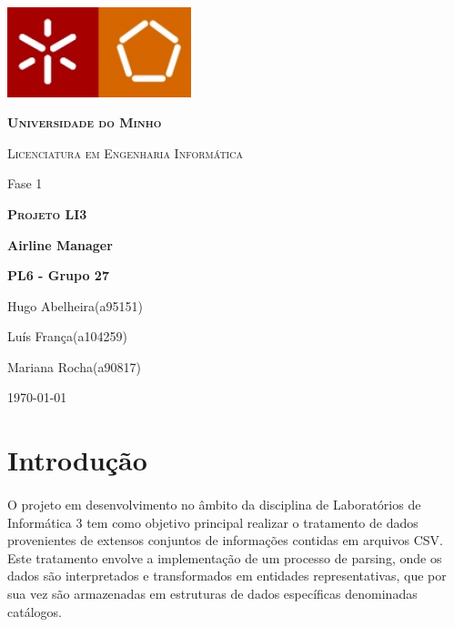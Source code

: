 \documentclass{article}
\begin{document}
\begin{center}
    \begin{minipage}{0.83\linewidth}
        \centering
        \includegraphics[width=0.4\textwidth]{Images/UM.jpg}\par\vspace{0.5cm}
        {\scshape\textbf{Universidade do Minho}} \par
        {\scshape Licenciatura em Engenharia Informática} \par
        \vspace{3cm}
        {\LARGE Fase 1\\} \par
        {\scshape\LARGE \textbf{Projeto LI3}\\} \par
        \vspace{1.0cm}
        {\LARGE \textbf{Airline Manager}} \par
        \vspace{2cm}
        {\LARGE\textbf {PL6 - Grupo 27}} \par
        \vspace{0.1cm}
        {\LARGE Hugo Abelheira(a95151)\par Luís França(a104259)\par Mariana Rocha(a90817) \par}
        
        \vspace{5cm}
        {\large \today\par}
        
    \end{minipage}
\end{center}
\newpage
\tableofcontents
\listoftables
\listoffigures

\newpage
\section{Introdução}
\paragraph{}O projeto em desenvolvimento no âmbito da disciplina de Laboratórios de Informática 3 tem como objetivo principal realizar o tratamento de dados provenientes de extensos conjuntos de informações contidas em arquivos CSV. Este tratamento envolve a implementação de um processo de parsing, onde os dados são interpretados e transformados em entidades representativas, que por sua vez são armazenadas em estruturas de dados específicas denominadas catálogos.
\vspace{-0.75cm} %
\end{document}
